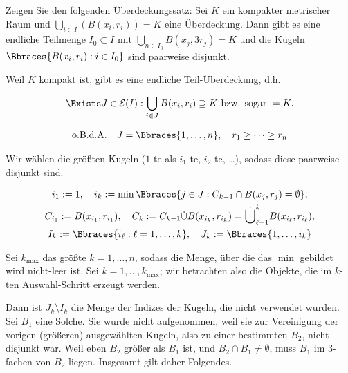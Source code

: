 
\begin{exercise}

Zeigen Sie den folgenden Überdeckungssatz:
Sei $K$ ein kompakter metrischer Raum und $\bigcup_{i \in I} (B(x_i, r_i)) = K$ eine Überdeckung.
Dann gibt es eine endliche Teilmenge $I_0 \subset I$ mit $\bigcup_{n \in I_0} B(x_j, 3 r_j) = K$ und die Kugeln $\Bbraces{B(x_i, r_i): i \in I_0}$ sind paarweise disjunkt.

\end{exercise}


\begin{solution}

Weil $K$ kompakt ist, gibt es eine endliche Teil-Überdeckung, d.h.

\begin{align*}
    \Exists J \in \mathcal{E}(I):
    \bigcup_{i \in J}
        B(x_i, r_i)
    \supseteq
    K
    ~\text{bzw. sogar}~
    =
    K.
\end{align*}

\begin{align*}
    \text{o.B.d.A.}
    \quad
    J = \Bbraces{1, \dots, n},
    \quad
    r_1 \geq \cdots \geq r_n
\end{align*}

Wir wählen die größten Kugeln ($1$-te als $i_1$-te, $i_2$-te, \dots), sodass diese paarweise disjunkt sind.

\begin{gather*}
    i_1 := 1,
    \quad
    i_k
    :=
    \min
    \Bbraces
    {
        j \in J:
        C_{k-1} \cap B(x_j, r_j) = \emptyset
    }, \\
    C_{i_1} := B(x_{i_1}, r_{i_1}),
    \quad
    C_k
    :=
    C_{k-1} \dot \cup B(x_{i_k}, r_{i_k})
    =
    \dot \bigcup_{\ell = 1}^k
        B(x_{i_\ell}, r_{i_\ell}), \\
    I_k := \Bbraces{i_\ell: \ell = 1, \dots, k},
    \quad
    J_k := \Bbraces{1, \dots, i_k}
\end{gather*}

Sei $k_{\max}$ das größte $k = 1, \dots, n$, sodass die Menge, über die das $\min$ gebildet wird nicht-leer ist.
Sei $k = 1, \dots, k_{\max}$; wir betrachten also die Objekte, die im $k$-ten Auswahl-Schritt erzeugt werden.

Dann ist $J_k \setminus I_k$ die Menge der Indizes der Kugeln, die nicht verwendet wurden.
Sei $B_1$ eine Solche.
Sie wurde nicht aufgenommen, weil sie zur Vereinigung der vorigen (größeren) ausgewählten Kugeln, also zu einer bestimmten $B_2$, nicht disjunkt war.
Weil eben $B_2$ größer als $B_1$ ist, und $B_2 \cap B_1 \neq \emptyset$, muss $B_1$ im $3$-fachen von $B_2$ liegen.
Insgesamt gilt daher Folgendes.


\end{solution}
